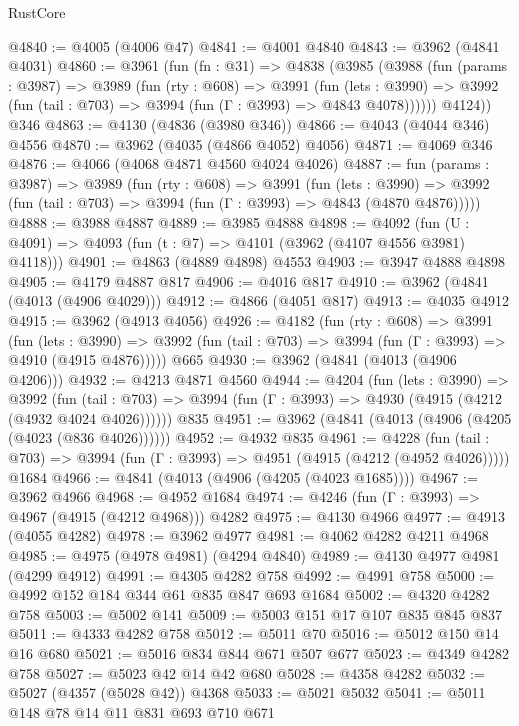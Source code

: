 \begin{lexlean}{RustCore}
\begin{coremodule}
@4840 := @4005 (@4006 @47)
@4841 := @4001 @4840
@4843 := @3962 (@4841 @4031)
@4860 := @3961
    (fun (fn : @31) =>
    @4838
      (@3985
        (@3988
          (fun (params : @3987) =>
          @3989
            (fun (rty : @608) =>
            @3991
              (fun (lets : @3990) =>
              @3992 (fun (tail : @703) => @3994 (fun (Γ : @3993) => @4843 @4078))))))
        @4124))
    @346
@4863 := @4130 (@4836 (@3980 @346))
@4866 := @4043 (@4044 @346) @4556
@4870 := @3962 (@4035 (@4866 @4052) @4056)
@4871 := @4069 @346
@4876 := @4066 (@4068 @4871 @4560 @4024 @4026)
@4887 := fun (params : @3987) =>
  @3989
    (fun (rty : @608) =>
    @3991
      (fun (lets : @3990) =>
      @3992 (fun (tail : @703) => @3994 (fun (Γ : @3993) => @4843 (@4870 @4876)))))
@4888 := @3988 @4887
@4889 := @3985 @4888
@4898 := @4092 (fun (U : @4091) => @4093 (fun (t : @7) => @4101 (@3962 (@4107 @4556 @3981) @4118)))
@4901 := @4863 (@4889 @4898) @4553
@4903 := @3947 @4888 @4898
@4905 := @4179 @4887 @817
@4906 := @4016 @817
@4910 := @3962 (@4841 (@4013 (@4906 @4029)))
@4912 := @4866 (@4051 @817)
@4913 := @4035 @4912
@4915 := @3962 (@4913 @4056)
@4926 := @4182
    (fun (rty : @608) =>
    @3991
      (fun (lets : @3990) =>
      @3992 (fun (tail : @703) => @3994 (fun (Γ : @3993) => @4910 (@4915 @4876)))))
    @665
@4930 := @3962 (@4841 (@4013 (@4906 @4206)))
@4932 := @4213 @4871 @4560
@4944 := @4204
    (fun (lets : @3990) =>
    @3992
      (fun (tail : @703) => @3994 (fun (Γ : @3993) => @4930 (@4915 (@4212 (@4932 @4024 @4026))))))
    @835
@4951 := @3962 (@4841 (@4013 (@4906 (@4205 (@4023 (@836 @4026))))))
@4952 := @4932 @835
@4961 := @4228
    (fun (tail : @703) => @3994 (fun (Γ : @3993) => @4951 (@4915 (@4212 (@4952 @4026)))))
    @1684
@4966 := @4841 (@4013 (@4906 (@4205 (@4023 @1685))))
@4967 := @3962 @4966
@4968 := @4952 @1684
@4974 := @4246 (fun (Γ : @3993) => @4967 (@4915 (@4212 @4968))) @4282
@4975 := @4130 @4966
@4977 := @4913 (@4055 @4282)
@4978 := @3962 @4977
@4981 := @4062 @4282 @4211 @4968
@4985 := @4975 (@4978 @4981) (@4294 @4840)
@4989 := @4130 @4977 @4981 (@4299 @4912)
@4991 := @4305 @4282 @758
@4992 := @4991 @758
@5000 := @4992 @152 @184 @344 @61 @835 @847 @693 @1684
@5002 := @4320 @4282 @758
@5003 := @5002 @141
@5009 := @5003 @151 @17 @107 @835 @845 @837
@5011 := @4333 @4282 @758
@5012 := @5011 @70
@5016 := @5012 @150 @14 @16 @680
@5021 := @5016 @834 @844 @671 @507 @677
@5023 := @4349 @4282 @758
@5027 := @5023 @42 @14 @42 @680
@5028 := @4358 @4282
@5032 := @5027 (@4357 (@5028 @42)) @4368
@5033 := @5021 @5032
@5041 := @5011 @148 @78 @14 @11 @831 @693 @710 @671

\end{coremodule}
\end{lexlean}
